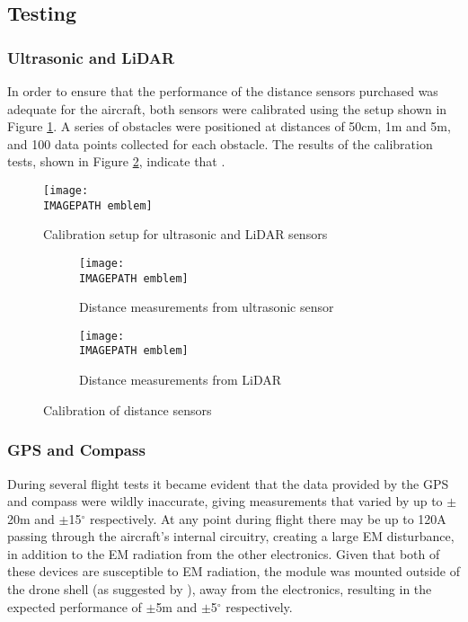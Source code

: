 \subsection{Testing}
\subsubsection*{Ultrasonic and LiDAR}
In order to ensure that the performance of the distance sensors purchased was adequate for the aircraft, both sensors were calibrated using the setup shown in Figure \ref{fig:sensortests}. A series of obstacles were positioned at distances of 50cm, 1m and 5m, and 100 data points collected for each obstacle. The results of the calibration tests, shown in Figure \ref{fig:sensortestresults},  indicate that .

\begin{figure}[!ht]
	\centering
	\texttt{[image: \\IMAGEPATH emblem]}
	\caption{Calibration setup for ultrasonic and LiDAR sensors}
	\label{fig:sensortests}
\end{figure}

\begin{figure}
	\centering
	\begin{subfigure}{0.4\textwidth}
		\centering
		\texttt{[image: \\IMAGEPATH emblem]}
		\caption{Distance measurements from ultrasonic sensor}
	\end{subfigure} %
	\begin{subfigure}{0.4\textwidth}
		\centering
		\texttt{[image: \\IMAGEPATH emblem]}
		\caption{Distance measurements from LiDAR}
	\end{subfigure}
	
	\caption{Calibration of distance sensors}
	\label{fig:sensortestresults}
\end{figure}
	
\subsubsection*{GPS and Compass}  
During several flight tests it became evident that the data provided by the GPS and compass were wildly inaccurate, giving measurements that varied by up to $\pm$20m and $\pm$15$^\circ$ respectively. At any point during flight there may be up to 120A passing through the aircraft's internal circuitry, creating a large EM disturbance, in addition to the EM radiation from the other electronics. Given that both of these devices are susceptible to EM radiation\cite{ref:gpsinterference}, the module was mounted outside of the drone shell (as suggested by \cite{ref:gpsposition}), away from the electronics, resulting in the expected performance of $\pm$5m and $\pm$5$^\circ$ respectively.